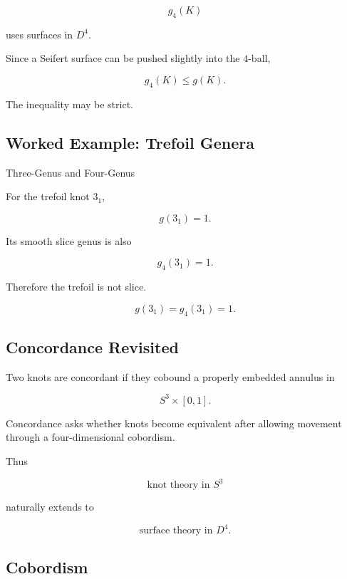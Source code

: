 \[
g_4(K)
\]

uses surfaces in \(D^4\).

Since a Seifert surface can be pushed slightly into the \(4\)-ball,

\[
\boxed{
g_4(K)\leq g(K).
}
\]

The inequality may be strict.

\subsection{Worked Example: Trefoil Genera}
\label{subsec:worked-trefoil-genera}

\begin{workedexamplebox}{Three-Genus and Four-Genus}

For the trefoil knot \(3_1\),

\[
g(3_1)=1.
\]

Its smooth slice genus is also

\[
g_4(3_1)=1.
\]

Therefore the trefoil is not slice.

\begin{answerbox}
\[
\boxed{
g(3_1)=g_4(3_1)=1.
}
\]
\end{answerbox}
\end{workedexamplebox}

\subsection{Concordance Revisited}
\label{subsec:concordance-low-dimensional}

Two knots are concordant if they cobound a properly embedded annulus in

\[
S^3\times[0,1].
\]

Concordance asks whether knots become equivalent after allowing movement
through a four-dimensional cobordism.

Thus

\[
\boxed{
\text{knot theory in }S^3
}
\]

naturally extends to

\[
\boxed{
\text{surface theory in }D^4.
}
\]

\subsection{Cobordism}
\label{subsec:cobordism-low-dimensional}

